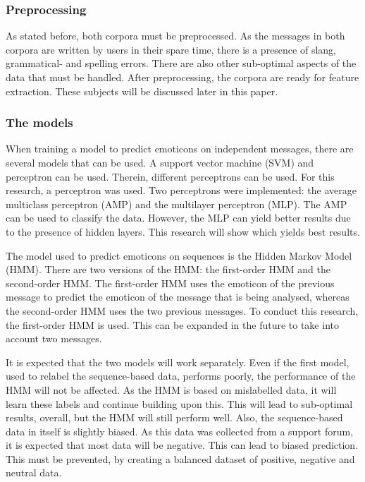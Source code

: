 \subsubsection*{Preprocessing} 
As stated before, both corpora must be preprocessed. As the messages in both corpora are written by users in their spare time, there is a presence of slang, grammatical- and spelling errors. There are also other sub-optimal aspects of the data that must be handled. After preprocessing, the corpora are ready for feature extraction. These subjects will be discussed later in this paper.


\subsubsection*{The models} 
When training a model to predict emoticons on independent messages, there are several models that can be used. A support vector machine (SVM) and perceptron can be used. Therein, different perceptrons can be used. For this research, a perceptron was used. Two perceptrons were implemented: the average multiclass perceptron (AMP) and the multilayer perceptron (MLP). The AMP can be used to classify the data. However, the MLP can yield better results due to the presence of hidden layers. This research will show which yields best results.

The model used to predict emoticons on sequences is the Hidden Markov Model (HMM). There are two versions of the HMM: the first-order HMM and the second-order HMM. The first-order HMM uses the emoticon of the previous message to predict the emoticon of the message that is being analysed, whereas the second-order HMM uses the two previous messages. To conduct this research, the first-order HMM is used. This can be expanded in the future to take into account two messages.

It is expected that the two models will work separately. Even if the first model, used to relabel the sequence-based data, performs poorly, the performance of the HMM will not be affected. As the HMM is based on mislabelled data, it will learn these labels and continue building upon this. This will lead to sub-optimal results, overall, but the HMM will still perform well. Also, the sequence-based data in itself is slightly biased. As this data was collected from a support forum, it is expected that most data will be negative. This can lead to biased prediction. This must be prevented, by creating a balanced dataset of positive, negative and neutral data. 

